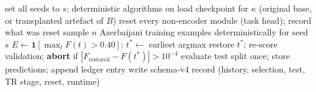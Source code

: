 \begin{algorithm}[!t]
\caption{One run $(B,c,n,s)$ ()}
\label{alg:training}
set all seeds to $s$; deterministic algorithms on\;
load checkpoint for $\kappa$ (original base, or transplanted artefact of $B$)\;
reset every non-encoder module (task head); record what was reset\;
sample $n$ Azerbaijani training examples deterministically for seed $s$\;
$E\leftarrow\mathbf{1}[\max_t F(t)>0.40]$; $t^\ast\leftarrow$ earliest argmax 
restore $t^\ast$; re-score validation; \textbf{abort} if $|F_{\text{restored}}-F(t^\ast)|>10^{-4}$\;
evaluate test split once; store predictions; append ledger entry\;
write schema-v4 record (history, selection, test, TR stage, reset, runtime)\;
\end{algorithm}

